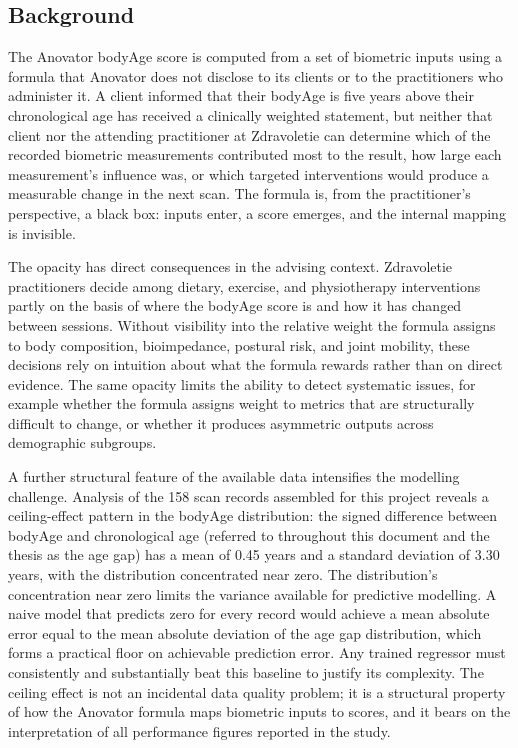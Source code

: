 \documentclass[11pt,a4paper]{article}
\begin{document}
\subsection{Background}

The Anovator bodyAge score is computed from a set of biometric inputs using a formula that Anovator does not disclose to its clients or to the practitioners who administer it. A client informed that their bodyAge is five years above their chronological age has received a clinically weighted statement, but neither that client nor the attending practitioner at Zdravoletie can determine which of the recorded biometric measurements contributed most to the result, how large each measurement's influence was, or which targeted interventions would produce a measurable change in the next scan. The formula is, from the practitioner's perspective, a black box: inputs enter, a score emerges, and the internal mapping is invisible.

The opacity has direct consequences in the advising context. Zdravoletie practitioners decide among dietary, exercise, and physiotherapy interventions partly on the basis of where the bodyAge score is and how it has changed between sessions. Without visibility into the relative weight the formula assigns to body composition, bioimpedance, postural risk, and joint mobility, these decisions rely on intuition about what the formula rewards rather than on direct evidence. The same opacity limits the ability to detect systematic issues, for example whether the formula assigns weight to metrics that are structurally difficult to change, or whether it produces asymmetric outputs across demographic subgroups.

A further structural feature of the available data intensifies the modelling challenge. Analysis of the 158 scan records assembled for this project reveals a ceiling-effect pattern in the bodyAge distribution: the signed difference between bodyAge and chronological age (referred to throughout this document and the thesis as the age gap) has a mean of 0.45 years and a standard deviation of 3.30 years, with the distribution concentrated near zero. The distribution's concentration near zero limits the variance available for predictive modelling. A naive model that predicts zero for every record would achieve a mean absolute error equal to the mean absolute deviation of the age gap distribution, which forms a practical floor on achievable prediction error. Any trained regressor must consistently and substantially beat this baseline to justify its complexity. The ceiling effect is not an incidental data quality problem; it is a structural property of how the Anovator formula maps biometric inputs to scores, and it bears on the interpretation of all performance figures reported in the study.
\end{document}
